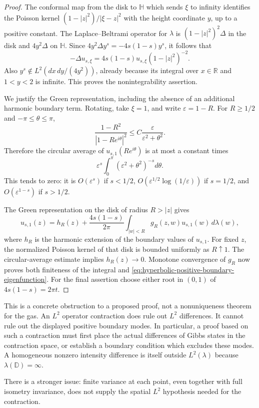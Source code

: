 \documentclass[11pt,a4paper]{article}
\numberwithin{equation}{section}
\theoremstyle{definition}
\theoremstyle{remark}
\begin{document}
\begin{proof}
The conformal map from the disk to $\mathbb H$ which sends $\xi$ to
infinity identifies the Poisson kernel
$(1-|z|^2)/|\xi-z|^2$ with the height coordinate $y$, up to a
positive constant.  The Laplace--Beltrami operator for $\lambda$ is
$(1-|z|^2)^2\Delta$ in the disk and $4y^2\Delta$ on $\mathbb H$.
Since $4y^2\Delta y^s=-4s(1-s)y^s$, it follows that
\[
 -\Delta u_{s,\xi}
    =4s(1-s)u_{s,\xi}(1-|z|^2)^{-2}.
\]
Also $y^s\notin L^2(dx\,dy/(4y^2))$, already because its integral
over $x\in\mathbb R$ and $1<y<2$ is infinite.  This proves the
nonintegrability assertion.

We justify the Green representation, including the absence of an
additional harmonic boundary term.  Rotating, take $\xi=1$, and write
$\varepsilon=1-R$.  For $R\ge1/2$ and $-\pi\le\theta\le\pi$,
\[
 \frac{1-R^2}{|1-Re^{i\theta}|^2}
       \le C\frac{\varepsilon}{\varepsilon^2+\theta^2}.
\]
Therefore the circular average of $u_{s,1}(Re^{i\theta})$ is at
most a constant times
\[
 \varepsilon^s\int_0^\pi
             (\varepsilon^2+\theta^2)^{-s}d\theta.
\]
This tends to zero: it is $O(\varepsilon^s)$ if $s<1/2$,
$O(\varepsilon^{1/2}\log(1/\varepsilon))$ if $s=1/2$, and
$O(\varepsilon^{1-s})$ if $s>1/2$.

The Green representation on the disk of radius $R>|z|$ gives
\[
 u_{s,1}(z)
  =h_R(z)+\frac{4s(1-s)}{2\pi}
        \int_{|w|<R}g_R(z,w)u_{s,1}(w)\,d\lambda(w),
\]
where $h_R$ is the harmonic extension of the boundary values of
$u_{s,1}$.  For fixed $z$, the normalized Poisson kernel of that
disk is bounded uniformly as $R\uparrow1$.  The circular-average
estimate implies $h_R(z)\to0$.  Monotone convergence of $g_R$
now proves both finiteness of the integral and
\eqref{eq:hyperbolic-positive-boundary-eigenfunction}.
For the final assertion choose either root in $(0,1)$ of
$4s(1-s)=2\pi t$.
\end{proof}

This is a concrete obstruction to a proposed proof, not a
nonuniqueness theorem for the gas.  An $L^2$ operator contraction
does rule out $L^2$ differences.  It cannot rule out the displayed
positive boundary modes.  In particular, a proof based on such a
contraction must first place the actual differences of Gibbs states
in the contraction space, or establish a boundary condition which
excludes these modes.  A homogeneous nonzero intensity difference
is itself outside $L^2(\lambda)$ because $\lambda(\mathbb D)=\infty$.

There is a stronger issue: finite variance at each point, even together
with full isometry invariance, does not supply the spatial $L^2$
hypothesis needed for the contraction.
\end{document}
